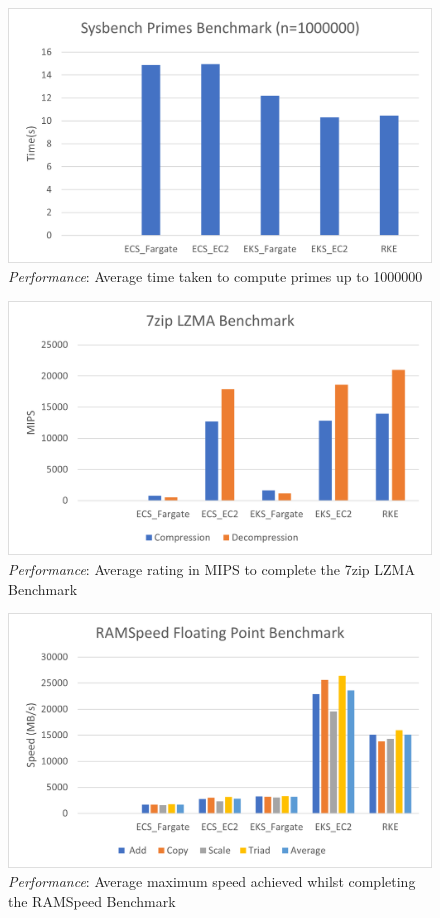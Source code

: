\begin{figure}[hp]
  \includegraphics{images/perf-sysbench.png}
  \caption{\emph{Performance}: Average time taken to compute primes up to 1000000 }
  \label{fig:perf_sysbench}
\end{figure}

\begin{figure}[hp]
  \includegraphics{images/perf-7zip.png}
  \caption{\emph{Performance}: Average rating in MIPS to complete the 7zip LZMA Benchmark }
  \label{fig:perf_7zip}
\end{figure}

\begin{figure}[hp]
  \includegraphics{images/perf-RAMSpeed.png}
  \caption{\emph{Performance}: Average maximum speed achieved whilst completing the RAMSpeed Benchmark }
  \label{fig:perf_RAMSpeed}
\end{figure}

